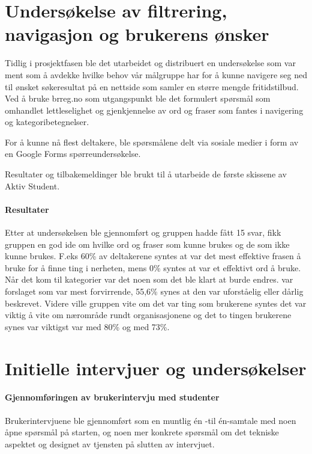 \section{Undersøkelse av filtrering, navigasjon og brukerens ønsker}
\label{section:google-forms-test}
Tidlig i prosjektfasen ble det utarbeidet og distribuert en undersøkelse som var ment som å avdekke hvilke behov vår målgruppe har for å kunne navigere seg ned til ønsket søkeresultat på en nettside som samler en større mengde fritidstilbud.
Ved å bruke brreg.no som utgangspunkt ble det formulert spørsmål som omhandlet lettleselighet og gjenkjennelse av ord og fraser som fantes i navigering og kategoribetegnelser.

For å kunne nå flest deltakere, ble spørsmålene delt via sosiale medier i form av en Google Forms spørreundersøkelse.

Resultater og tilbakemeldinger ble brukt til å utarbeide de første skissene av Aktiv Student. 

\paragraph{Resultater}
Etter at undersøkelsen ble gjennomført og gruppen hadde fått 15 svar, fikk gruppen en god ide om hvilke ord og fraser som kunne brukes og de som ikke kunne brukes. F.eks 60\% av deltakerene syntes at  var det mest effektive frasen å bruke for å finne ting i nerheten, mens 0\% syntes at  var et effektivt ord å bruke. Når det kom til kategorier var det noen som det ble klart at burde endres.  var forslaget som var mest forvirrende, 55,6\% synes at den var uforståelig eller dårlig beskrevet. Videre ville gruppen vite om det var ting som brukerene syntes det var viktig å vite om nærområde rundt organisasjonene og det to tingen brukerene synes var viktigst var  med 80\% og  med 73\%.

\section{Initielle intervjuer og undersøkelser}
\label{section:init-brukerintervjuer}

\paragraph{Gjennomføringen av brukerintervju med studenter}
Brukerintervjuene ble gjennomført som en muntlig én -til én-samtale med noen åpne spørsmål på starten, og noen mer konkrete spørsmål om det tekniske aspektet og designet av tjensten på slutten av intervjuet. 

